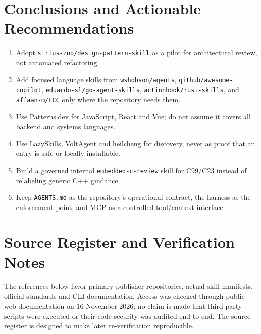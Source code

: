 \documentclass[11pt,letterpaper]{article}
\begin{document}
\section{Conclusions and Actionable Recommendations}
\begin{insight}
\begin{enumerate}
\item Adopt \texttt{sirius-zuo/design-pattern-skill} as a pilot for architectural review, not automated refactoring.
\item Add focused language skills from \nolinkurl{wshobson/agents}, \nolinkurl{github/awesome-copilot}, \nolinkurl{eduardo-sl/go-agent-skills}, \nolinkurl{actionbook/rust-skills}, and \nolinkurl{affaan-m/ECC} only where the repository needs them.
\item Use Patterns.dev for JavaScript, React and Vue; do not assume it covers all backend and systems languages.
\item Use LazySkills, VoltAgent and heilcheng for discovery, never as proof that an entry is safe or locally installable.
\item Build a governed internal \texttt{embedded-c-review} skill for C99/C23 instead of relabeling generic C++ guidance.
\item Keep \texttt{AGENTS.md} as the repository's operational contract, the harness as the enforcement point, and MCP as a controlled tool/context interface.
\end{enumerate}
\end{insight}

\newpage
\section{Source Register and Verification Notes}
The references below favor primary publisher repositories, actual skill manifests, official standards and CLI documentation. Access was checked through public web documentation on 16 November 2026; no claim is made that third-party scripts were executed or their code security was audited end-to-end. The source register is designed to make later re-verification reproducible.
\end{document}

